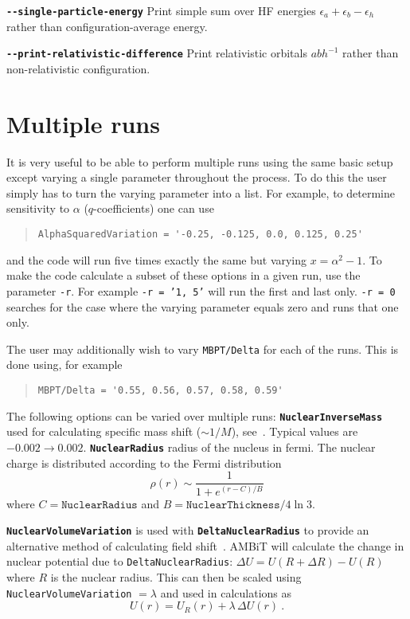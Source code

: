 \documentclass[a4paper,11pt]{article}
\newcommand{\option}[1]{\smallskip\noindent\textbf{\texttt{#1}}}
\begin{document}
\option{-{}-single-particle-energy} Print simple sum over HF energies $\epsilon_a + \epsilon_b - \epsilon_h$ rather than configuration-average energy.

\option{-{}-print-relativistic-difference} Print relativistic orbitals $a b h^{-1}$ rather than non-relativistic configuration.

\section{Multiple runs}

It is very useful to be able to perform multiple runs using the same basic setup except varying a single parameter throughout the process. To do this the user simply has to turn the varying parameter into a list. For example, to determine sensitivity to $\alpha$ ($q$-coefficients) one can use
\begin{quote}
\begin{verbatim}
AlphaSquaredVariation = '-0.25, -0.125, 0.0, 0.125, 0.25'
\end{verbatim}
\end{quote}
and the code will run five times exactly the same but varying $x = \alpha^2 - 1$. To make the code calculate a subset of these options in a given run, use the parameter \texttt{-r}. For example \texttt{-r = '1, 5'} will run the first and last only. \texttt{-r = 0} searches for the case where the varying parameter equals zero and runs that one only.

The user may additionally wish to vary \texttt{MBPT/Delta} for each of the runs. This is done using, for example
\begin{quote}
\begin{verbatim}
MBPT/Delta = '0.55, 0.56, 0.57, 0.58, 0.59'
\end{verbatim}
\end{quote}

The following options can be varied over multiple runs:
\option{NuclearInverseMass} used for calculating specific mass shift ($\sim 1/M$), see~\cite{berengut03pra,berengut05pra,berengut06pra}. Typical values are $-0.002 \rightarrow 0.002$.
\option{NuclearRadius} radius of the nucleus in fermi. The nuclear charge is distributed according to the Fermi distribution
\[
\rho(r) \sim \frac{1}{1 + e^{(r - C)/B}}
\]
where $C = \texttt{NuclearRadius}$ and $B = \texttt{NuclearThickness}/4\ln 3$.

\option{NuclearVolumeVariation} is used with \texttt{\textbf{DeltaNuclearRadius}} to provide an alternative method of calculating field shift~\cite{berengut03pra}. AMBiT will calculate the change in nuclear potential due to \texttt{DeltaNuclearRadius}: $\Delta U = U(R+\Delta R) - U(R)$ where $R$ is the nuclear radius. This can then be scaled using \texttt{NuclearVolumeVariation} $=\lambda$ and used in calculations as
\[
	U(r) = U_R(r) + \lambda\, \Delta U(r)\ .
\]
\end{document}
